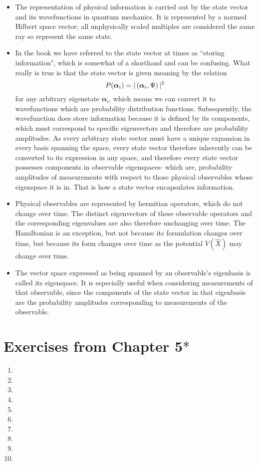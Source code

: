 \begin{itemize}
    \item The representation of physical information is carried out by the state vector and its wavefunctions in quantum mechanics. It is represented by a normed Hilbert space vector; all unphysically scaled multiples are considered the same ray so represent the same state.
    \item In the book we have referred to the state vector at times as ``storing information", which is somewhat of a shorthand and can be confusing. What really is true is that the state vector is given meaning by the relation
    $$
    P(\bm{\alpha}_{i})=|\left(\bm{\alpha}_{i},\Psi\right)|^{2}
    $$
    for any arbitrary eigenstate $\bm{\alpha}_{i}$, which means we can convert it to wavefunctions which are probability distribution functions. Subsequently, the wavefunction does store information because it is defined by its components, which must correspond to specific eigenvectors and therefore are probability amplitudes. As every arbitrary state vector must have a unique expansion in every basis spanning the space, every state vector therefore inherently can be converted to its expression in any space, and therefore every state vector possesses components in observable eigenspaces- which are, probability amplitudes of measurements with respect to those physical observables whose eigenspace it is in. That is how a state vector encapsulates information.
    \item Physical observables are represented by hermitian operators, which do not change over time. The distinct eigenvectors of these observable operators and the corresponding eigenvalues are also therefore unchanging over time. The Hamiltonian is an exception, but not because its formulation changes over time, but because its form changes over time as the potential $V(\hat{X})$ may change over time.
    \item The vector space expressed as being spanned by an observable's eigenbasis is called its eigenspace. It is especially useful when considering measurements of that observable, since the components of the state vector in that eigenbasis are the probability amplitudes corresponding to measurements of the observable.
\end{itemize}
\section{Exercises from Chapter 5$\ast$}
\begin{enumerate}
    \item 
    \item
    \item
    \item
    \item
    \item
    \item
    \item
    \item
    \item
\end{enumerate}